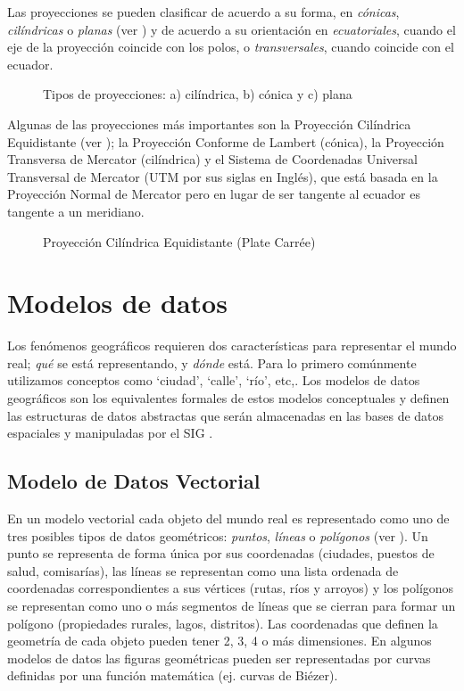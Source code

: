 Las proyecciones se pueden clasificar de acuerdo a su forma, en \emph{cónicas}, \emph{cilíndricas} o \emph{planas} (ver ) y de acuerdo a su orientación en \emph{ecuatoriales}, cuando el eje de la proyección coincide con los polos, o \emph{transversales}, cuando coincide con el ecuador.

\begin{figure}[h]
	\centering
	
	\caption[Tipos de proyecciones por forma]{Tipos de proyecciones: a) cilíndrica, b) cónica y c) plana}
	\label{fig:tipos-proyecciones} 
\end{figure}

Algunas de las proyecciones más importantes son la Proyección Cilíndrica Equidistante (ver ); la Proyección Conforme de Lambert (cónica), la Proyección Transversa de Mercator (cilíndrica) y el Sistema de Coordenadas Universal Transversal de Mercator (UTM por sus siglas en Inglés), que está basada en la Proyección Normal de Mercator pero en lugar de ser tangente al ecuador es tangente a un meridiano.

\begin{figure}[h]
	\centering
	
	\caption[Proyección cilíndrica equidistante]{Proyección Cilíndrica Equidistante (Plate Carrée)}
	\label{fig:proyeccion-equidistante} 
\end{figure}

\section{Modelos de datos}

Los fenómenos geográficos requieren dos características para representar el mundo real; \emph{qué} se está representando, y \emph{dónde} está. Para lo primero comúnmente utilizamos conceptos como `ciudad', `calle', `río', etc,. Los modelos de datos geográficos son los equivalentes formales de estos modelos conceptuales y definen las estructuras de datos abstractas que serán almacenadas en las bases de datos espaciales y manipuladas por el SIG \cite{burrough1998principles}.

\subsection{Modelo de Datos Vectorial}

En un modelo vectorial cada objeto del mundo real es representado como uno de tres posibles tipos de datos geométricos: \emph{puntos}, \emph{líneas} o \emph{polígonos} (ver ). Un punto se representa de forma única por sus coordenadas (ciudades, puestos de salud, comisarías), las líneas se representan como una lista ordenada de coordenadas correspondientes a sus vértices (rutas, ríos y arroyos) y los polígonos se representan como uno o más segmentos de líneas que se cierran para formar un polígono (propiedades rurales, lagos, distritos). Las coordenadas que definen la geometría de cada objeto pueden tener 2, 3, 4 o más dimensiones. En algunos modelos de datos las figuras geométricas pueden ser representadas por curvas definidas por una función matemática (ej. curvas de Biézer).

